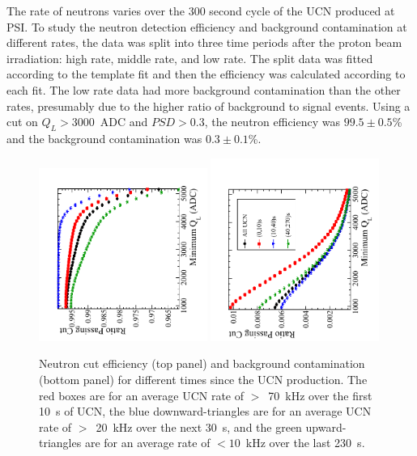 \documentclass[letter,twocolumn,preprint,3p]{elsarticle}
\begin{document}
The rate of neutrons varies over the 300 second cycle of the UCN
produced at PSI.  To study the neutron detection efficiency and
background contamination at different rates, the data was split into
three time periods after the proton beam irradiation: high rate,
middle rate, and low rate.  The split data was fitted according to the
template fit and then the efficiency was calculated according to each
fit.  The low rate data had more background contamination than the
other rates, presumably due to the higher ratio of background to
signal events.  Using a cut on $Q_L > 3000$~ADC and $PSD>0.3$, the
neutron efficiency was $99.5\pm0.5$\% and the background contamination
was $0.3\pm0.1$\%.

\begin{figure}[!htpb]
\centering \includegraphics[width = 0.49\textwidth, angle=-90]{figures/neutronEffLayered.pdf}
\centering \includegraphics[width = 0.49\textwidth, angle=-90]{figures/backgroundContLayered.pdf}
\caption{ Neutron cut efficiency (top panel) and background
  contamination (bottom panel) for different times since the UCN
  production.  The red boxes are for an average UCN rate of $>$~70~kHz
  over the first 10~s of UCN, the blue downward-triangles are for an
  average UCN rate of $>$~20~kHz over the next 30~s, and the green
  upward-triangles are for an average rate of $<10$~kHz over the last
  230~s.}
\label{fig:detectionEffLayered}
\end{figure}
\end{document}
